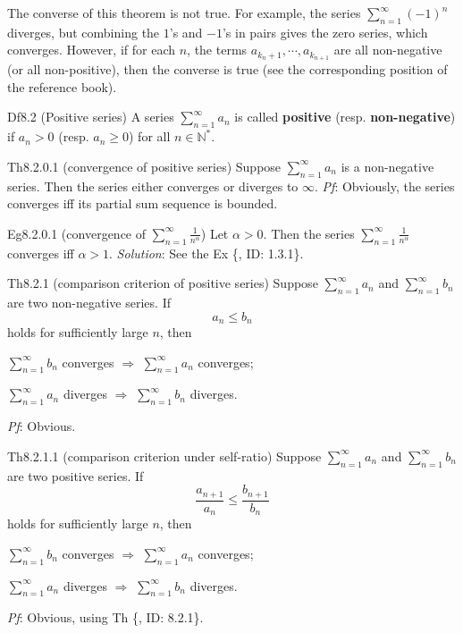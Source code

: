 \documentclass{article}
\begin{document}
\begin{Rmk}{}
    \textcolor{Th}{The converse of this theorem is not true.} For example, the series $\sum_{n=1}^{\infty} (-1)^{n}$ diverges, but combining the $1$'s and $-1$'s in pairs gives the zero series, which converges. However, \textcolor{Th}{if for each $n$, the terms $a_{k_n+1}, \cdots, a_{k_{n+1}}$ are all non-negative (or all non-positive), then the converse is true (see the corresponding position of the reference book).}
\end{Rmk}

\begin{Df}{Df8.2 (Positive series)}
    A series $\sum_{n=1}^{\infty} a_n$ is called \textbf{positive} (resp. \textbf{non-negative}) if $a_n>0$ (resp. $a_n\geq 0$) for all $n\in\mathbb{N}^\ast$.
\end{Df}

\begin{Th}{Th8.2.0.1 (convergence of positive series)}
    Suppose $\sum_{n=1}^{\infty} a_n$ is a non-negative series. Then the series either converges or diverges to $\infty$.
    \tcblower
    \textit{Pf}: Obviously, the series converges iff its partial sum sequence is bounded. 
\end{Th}

\begin{Th}{Eg8.2.0.1 (convergence of $\sum_{n=1}^{\infty} \frac{1}{n^\alpha}$)}
    Let $\alpha>0$. Then the series $\sum_{n=1}^{\infty} \frac{1}{n^\alpha}$ converges iff $\alpha>1$.
    \tcblower
    \textit{Solution}: See the Ex \{, ID: 1.3.1\}.
\end{Th}

\begin{Th}{Th8.2.1 (comparison criterion of positive series)}
    Suppose $\sum_{n=1}^{\infty} a_n$ and $\sum_{n=1}^{\infty} b_n$ are two non-negative series. If
    $$ a_n \leq b_n $$
    holds for sufficiently large $n$, then
    \begin{compactitem}
        \item $\sum_{n=1}^{\infty} b_n$ converges $\Rightarrow$ $\sum_{n=1}^{\infty} a_n$ converges;
        \item $\sum_{n=1}^{\infty} a_n$ diverges $\Rightarrow$ $\sum_{n=1}^{\infty} b_n$ diverges.
    \end{compactitem}
    \tcblower
    \textit{Pf}: Obvious.
\end{Th}

\begin{Th}{Th8.2.1.1 (comparison criterion under self-ratio)}
    Suppose $\sum_{n=1}^{\infty} a_n$ and $\sum_{n=1}^{\infty} b_n$ are two positive series. If
    $$ \frac{a_{n+1}}{a_n} \leq \frac{b_{n+1}}{b_n} $$
    holds for sufficiently large $n$, then
    \begin{compactitem}
        \item $\sum_{n=1}^{\infty} b_n$ converges $\Rightarrow$ $\sum_{n=1}^{\infty} a_n$ converges;
        \item $\sum_{n=1}^{\infty} a_n$ diverges $\Rightarrow$ $\sum_{n=1}^{\infty} b_n$ diverges.
    \end{compactitem}
    \tcblower
    \textit{Pf}: Obvious, using Th \{, ID: 8.2.1\}.
\end{Th}
\end{document}
